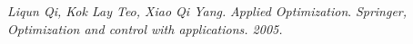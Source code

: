 
\begin{thebibliography}{99}


        \textit{Liqun Qi, Kok Lay Teo, Xiao Qi Yang.} {\it Applied Optimization}. \textit{Springer, Optimization and control with applications. 2005.}


       \end{thebibliography}
